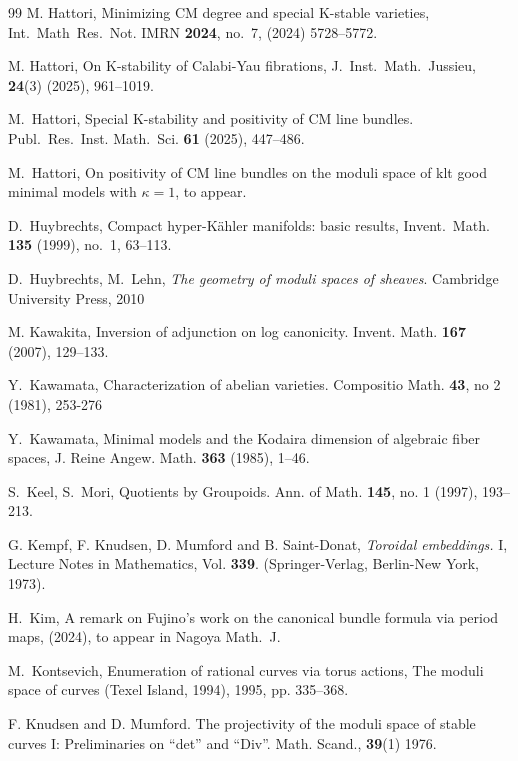 \documentclass[12pt,twoside]{amsart}
\theoremstyle{definition}
\begin{document}
\begin{thebibliography}{99}
 M. Hattori, Minimizing CM degree and special K-stable varieties, Int.~Math~Res.~Not. IMRN {\bf2024}, no.~7, (2024) 5728–5772.

 M. Hattori, On K-stability of Calabi-Yau fibrations, J.~Inst.~Math.~Jussieu, {\bf24}(3) (2025), 961--1019.

 M.~Hattori, Special K-stability and positivity of CM line bundles. Publ.~Res.~Inst. Math.~Sci. {\bf61} (2025), 447--486.

 M.~Hattori, On positivity of CM line bundles on the moduli space of klt good minimal models with $\kappa=1$, to appear.

D.~Huybrechts, Compact hyper-K\"{a}hler manifolds: basic results, Invent.~Math. {\bf 135} (1999), no.~1, 63--113.

D.~Huybrechts, M.~Lehn,
  {\it The geometry of moduli spaces of sheaves}. Cambridge University Press, 2010



 M. Kawakita, Inversion of adjunction on log canonicity. Invent. Math. {\bf 167} (2007), 129--133.

Y.~Kawamata, Characterization of abelian varieties. Compositio Math. {\bf43}, no 2 (1981), 253-276

 Y.~Kawamata, Minimal models and the Kodaira dimension of algebraic fiber spaces, J. Reine Angew. Math. {\bf363} (1985), 1–46.

 S.~Keel, S.~Mori, Quotients by Groupoids. Ann. of Math.
{\bf145}, no. 1 (1997), 193--213. 

 G. Kempf, F. Knudsen, D. Mumford and B. Saint-Donat, {\it Toroidal embeddings.} I, Lecture Notes in Mathematics, Vol. {\bf 339}. (Springer-Verlag, Berlin-New York, 1973). 

 H.~Kim, A remark on Fujino's work on the canonical bundle formula via period maps, (2024), to appear in Nagoya Math.~J. 

 M.~Kontsevich, Enumeration of rational curves via torus actions, The moduli space of curves (Texel Island,
1994), 1995, pp. 335–368.

 F. Knudsen and D. Mumford. The projectivity of the moduli space of stable curves I: Preliminaries on “det” and “Div”. Math. Scand., {\bf39}(1) 1976.


\end{thebibliography}
\end{document}

